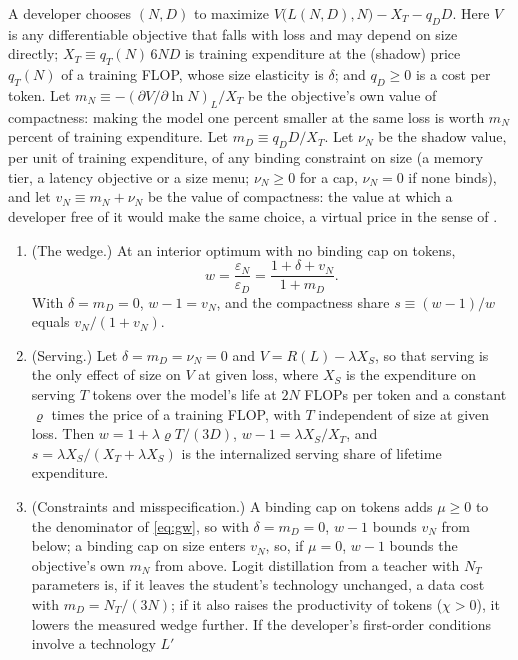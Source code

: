 \begin{proposition}\label{prop:wedge}
A developer chooses $(N,D)$ to maximize $V\big(L(N,D),N\big)-X_T-q_DD$. Here $V$ is any differentiable objective that
falls with loss and may depend on size directly; $X_T\equiv q_T(N)\,6ND$ is training expenditure at the (shadow) price
$q_T(N)$ of a training FLOP, whose size elasticity is $\delta$; and $q_D\ge0$ is a cost per token. Let
$m_N\equiv-(\partial V/\partial\ln N)_L/X_T$ be the objective's own value of compactness: making the model one percent
smaller at the same loss is worth $m_N$ percent of training expenditure. Let $m_D\equiv q_DD/X_T$. Let $\nu_N$ be the
shadow value, per unit of training expenditure, of any binding constraint on size (a memory tier, a latency objective or
a size menu; $\nu_N\ge0$ for a cap, $\nu_N=0$ if none binds), and let $v_N\equiv m_N+\nu_N$ be the value of compactness:
the value at which a developer free of it would make the same choice, a virtual price in the sense of
\citet{neary1980theory}.
\begin{enumerate}
\item[(i)] (The wedge.) At an interior optimum with no binding cap on tokens,
\begin{equation}\label{eq:gw}
w=\frac{\varepsilon_N}{\varepsilon_D}=\frac{1+\delta+v_N}{1+m_D}.
\end{equation}
With $\delta=m_D=0$, $w-1=v_N$, and the compactness share $s\equiv(w-1)/w$ equals $v_N/(1+v_N)$.
\item[(ii)] (Serving.) Let $\delta=m_D=\nu_N=0$ and $V=R(L)-\lambda X_S$, so that serving is the only effect of size on $V$ at
given loss, where $X_S$ is the expenditure on serving $T$ tokens over the model's life at $2N$ FLOPs per token and a
constant $\varrho$ times the price of a training FLOP, with $T$ independent of size at given loss. Then
$w=1+\lambda\varrho T/(3D)$, $w-1=\lambda X_S/X_T$, and $s=\lambda X_S/(X_T+\lambda X_S)$ is the internalized serving
share of lifetime expenditure.
\item[(iii)] (Constraints and misspecification.) A binding cap on tokens adds $\mu\ge0$ to the denominator of
\eqref{eq:gw}, so with $\delta=m_D=0$, $w-1$ bounds $v_N$ from below; a binding cap on size enters $v_N$, so, if
$\mu=0$, $w-1$ bounds the objective's own $m_N$ from above. Logit distillation from a teacher with $N_T$ parameters is, if it leaves the
student's technology unchanged, a data cost with $m_D=N_T/(3N)$; if it also raises the productivity of tokens
($\chi>0$), it lowers the measured wedge further. If the developer's first-order conditions involve a technology $L'$

\end{enumerate}
\end{proposition}
